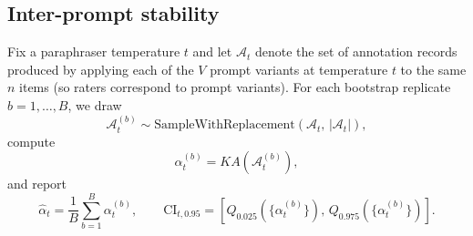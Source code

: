 \subsection{Inter-prompt stability}

Fix a paraphraser temperature $t$ and let $\mathcal{A}_{t}$ denote the set of annotation records produced by applying each of the $V$ prompt variants at temperature $t$ to the same $n$ items (so raters correspond to prompt variants). For each bootstrap replicate $b=1,\ldots,B$, we draw
\[
\mathcal{A}^{(b)}_{t} \sim \text{SampleWithReplacement}\!\left(\mathcal{A}_{t},\, |\mathcal{A}_{t}|\right),
\]
compute
\[
\alpha^{(b)}_{t} = KA\!\left(\mathcal{A}^{(b)}_{t}\right),
\]
and report
\[
\widehat{\alpha}_{t}=\frac{1}{B}\sum_{b=1}^{B}\alpha^{(b)}_{t},
\qquad
\text{CI}_{t,0.95}=\left[Q_{0.025}(\{\alpha^{(b)}_{t}\}),\, Q_{0.975}(\{\alpha^{(b)}_{t}\})\right].
\]


